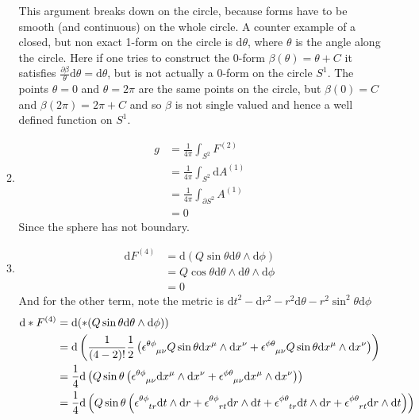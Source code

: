 \documentclass[12pt,a4]{article}
\newcommand{\e}{\mathrm{d}}
\begin{document}
\begin{enumerate}
\begin{enumerate}
        This argument breaks down on the circle, because forms have to be smooth (and continuous) on the whole circle.
        A counter example of a closed, but non exact 1-form on the circle is $\e \theta$, where $\theta$ is the angle along the circle.
        Here if one tries to construct the 0-form $\beta(\theta) = \theta + C$ it satisfies $\frac{\partial \beta}{\theta} \e \theta = \e \theta$, but is not actually a 0-form on the circle $S^1$.
        The points $\theta = 0$ and $\theta = 2 \pi$ are the same points on the circle, but $\beta(0) = C$ and $\beta(2 \pi) = 2 \pi + C$ and so $\beta$ is not single valued and hence a well defined function on $S^1$.
      \item
        \begin{align*}
          g &= \frac{1}{4 \pi } \int_{S^2} F^{(2)} \\
            &= \frac{1}{4 \pi } \int_{S^2} \e A^{(1)} \\
            &= \frac{1}{4 \pi } \int_{\partial S^2} A^{(1)} \\
            &= 0 
        \end{align*}
        Since the sphere has not boundary.
      \item
        \begin{align*}
          \e F^{(4)} &= \e (Q \sin \theta \e \theta \wedge \e \phi)\\
                     &= Q \cos \theta \e \theta \wedge \e \theta \wedge \e \phi\\
                     &= 0 
        \end{align*}
        And for the other term, note the metric is $\e t^2 - \e r^2 - r^2 \e \theta - r^2 \sin^2 \theta \e \phi$
        \begin{align*}
          \e * F^{(4)} &= \e (* (Q \sin \theta \e \theta \wedge \e \phi))\\
                       &= \e \left(\frac{1}{(4 - 2)!}\frac{1}{2} \left(\tensor{\epsilon}{^\theta ^\phi_\mu_\nu} Q \sin \theta \e x^\mu \wedge \e x^\nu + \tensor{\epsilon}{^\phi^\theta _\mu_\nu} Q \sin \theta \e x^\mu \wedge \e x^\nu\right)\right)\\
                       &= \frac{1}{4}\e \left(Q \sin \theta \left(\tensor{\epsilon}{^\theta ^\phi_\mu_\nu}  \e x^\mu \wedge \e x^\nu + \tensor{\epsilon}{^\phi^\theta _\mu_\nu} \e x^\mu \wedge \e x^\nu\right)\right)\\
                       &= \frac{1}{4}\e \left(Q \sin \theta \left( \tensor{\epsilon}{^\theta ^\phi_t_r} \e t \wedge \e r + \tensor{\epsilon}{^\theta ^\phi_r_t} \e r \wedge \e t + \tensor{\epsilon}{^\phi^\theta _t_r} \e t \wedge \e r + \tensor{\epsilon}{^\phi^\theta _r_t} \e r \wedge \e t\right)\right)

\end{align*}
\end{enumerate}
\end{enumerate}
\end{document}
